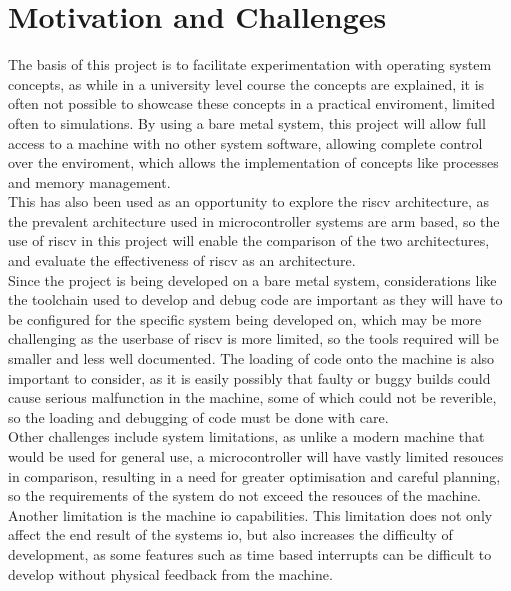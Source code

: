 \section{Motivation and Challenges}
The basis of this project is to facilitate experimentation with operating system concepts, as while in a university level course the concepts are explained, it is often not possible to showcase these concepts in a practical enviroment, limited often to simulations. By using a bare metal system, this project will allow full access to a machine with no other system software, allowing complete control over the enviroment, which allows the implementation of concepts like processes and memory management. \\
This has also been used as an opportunity to explore the \gls{riscv} architecture, as the prevalent architecture used in microcontroller systems are \gls{arm} based, so the use of \gls{riscv} in this project will enable the comparison of the two architectures, and evaluate the effectiveness of \gls{riscv} as an architecture.\\
Since the project is being developed on a bare metal system, considerations like the toolchain used to develop and debug code are important as they will have to be configured for the specific system being developed on, which may be more challenging as the userbase of \gls{riscv} is more limited, so the tools required will be smaller and less well documented. The loading of code onto the machine is also important to consider, as it is easily possibly that faulty or buggy builds could cause serious malfunction in the machine, some of which could not be reverible, so the loading and debugging of code must be done with care.\\
Other challenges include system limitations, as unlike a modern machine that would be used for general use, a microcontroller will have vastly limited resouces in comparison, resulting in a need for greater optimisation and careful planning, so the requirements of the system do not exceed the resouces of the machine. Another limitation is the machine \ac{io} capabilities. This limitation does not only affect the end result of the systems \ac{io}, but also increases the difficulty of development, as some features such as time based interrupts can be difficult to develop without physical feedback from the machine.


